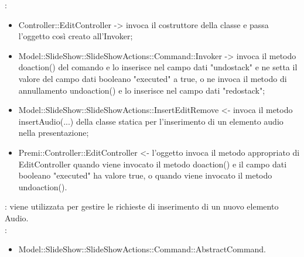 {{	\textbf{\relaz}: 
	\begin{itemize}
		\item Controller::\-EditController -> invoca il costruttore della classe e passa l’oggetto così creato all’Invoker;
		\item Model::\-SlideShow::\-SlideShowActions::\-Command::\-Invoker -> invoca il metodo doaction() del comando e lo inserisce nel campo dati "undostack" e ne setta il valore del campo dati booleano "executed" a true, o ne invoca il metodo di annullamento undoaction() e lo inserisce nel campo dati "redostack";
		\item Model::\-SlideShow::\-SlideShowActions::\-InsertEditRemove <- invoca il metodo insertAudio(...) della classe statica per l’inserimento di un elemento audio nella presentazione;
		\item Premi::\-Controller::\-EditController <- l'oggetto invoca il metodo appropriato di EditController quando viene invocato il metodo doaction() e il campo dati booleano "executed" ha valore true, o quando viene invocato il metodo undoaction().
	\end{itemize}	
	\textbf{\interfacce}: viene utilizzata per gestire le richieste di inserimento di un nuovo elemento Audio.\\
	\textbf{\base}: 
		\begin{itemize}
		\item Model::\-SlideShow::\-SlideShowActions::\-Command::\-AbstractCommand.
		\end{itemize}
		}
	}
